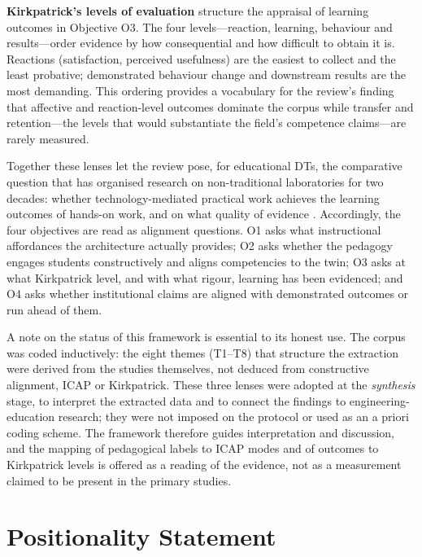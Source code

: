 \textbf{Kirkpatrick's levels of evaluation} \cite{kirkpatrick_kirkpatricks_2016} structure
the appraisal of learning outcomes in Objective O3. The four levels---reaction,
learning, behaviour and results---order evidence by how consequential and how
difficult to obtain it is. Reactions (satisfaction, perceived usefulness) are
the easiest to collect and the least probative; demonstrated behaviour change and
downstream results are the most demanding. This ordering provides a vocabulary
for the review's finding that affective and reaction-level outcomes dominate the
corpus while transfer and retention---the levels that would substantiate the
field's competence claims---are rarely measured.

Together these lenses let the review pose, for educational DTs, the comparative
question that has organised research on non-traditional laboratories for two
decades: whether technology-mediated practical work achieves the learning
outcomes of hands-on work, and on what quality of evidence \cite{ma_handson_2006,brinson_learning_2015}. Accordingly, the four objectives are read as alignment
questions. O1 asks what instructional affordances the architecture actually
provides; O2 asks whether the pedagogy engages students constructively and aligns
competencies to the twin; O3 asks at what Kirkpatrick level, and with what rigour,
learning has been evidenced; and O4 asks whether institutional claims are aligned
with demonstrated outcomes or run ahead of them.

A note on the status of this framework is essential to its honest use. The corpus
was coded inductively: the eight themes (T1--T8) that structure the extraction
were derived from the studies themselves, not deduced from constructive
alignment, ICAP or Kirkpatrick. These three lenses were adopted at the
\emph{synthesis} stage, to interpret the extracted data and to connect the findings to
engineering-education research; they were not imposed on the protocol or used as
an a priori coding scheme. The framework therefore guides interpretation and
discussion, and the mapping of pedagogical labels to ICAP modes and of outcomes
to Kirkpatrick levels is offered as a reading of the evidence, not as a
measurement claimed to be present in the primary studies.

\section{Positionality Statement}\label{positionality-statement}

